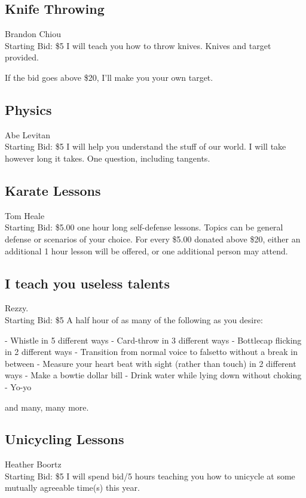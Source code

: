 \documentclass[11pt]{article}
\begin{document}
\subsection{Knife Throwing}
Brandon Chiou
\\
Starting Bid: \$5
\newline
I will teach you how to throw knives. Knives and target provided. 

If the bid goes above \$20, I'll make you your own target.
\subsection{Physics}
Abe Levitan
\\
Starting Bid: \$5
\newline
I will help you understand the stuff of our world. I will take however long it takes.
One question, including tangents.
\subsection{Karate Lessons}
Tom Heale
\\
Starting Bid: \$5.00
 one hour long self-defense lessons. Topics can be general defense or scenarios of your choice. For every \$5.00 donated above \$20, either an additional 1 hour lesson will be offered, or one additional person may attend.
\subsection{I teach you useless talents}
Rezzy.
\\
Starting Bid: \$5
\newline
A half hour of as many of the following as you desire:

- Whistle in 5 different ways
- Card-throw in 3 different ways
- Bottlecap flicking in 2 different ways
- Transition from normal voice to falsetto without a break in between
- Measure your heart beat with sight (rather than touch) in 2 different ways
- Make a bowtie dollar bill
- Drink water while lying down without choking
- Yo-yo

and many, many more.
\subsection{Unicycling Lessons}
Heather Boortz
\\
Starting Bid: \$5
\newline
I will spend bid/5 hours teaching you how to unicycle at some mutually agreeable time(s) this year. 
\end{document}
